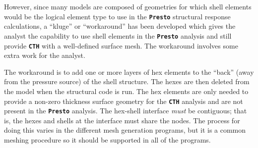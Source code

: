 \documentclass[11pt,twoside]{article}
\newcommand{\code}[1]
   {\mbox{\bf\tt #1}\null}
\begin{document}
However, since many models are composed of geometries for which shell
elements would be the logical element type to use in the \code{Presto}
structural response calculations, a ``kluge'' or ``workaround'' has
been developed which gives the analyst the capability to use shell
elements in the \code{Presto} analysis and still provide \code{CTH}
with a well-defined surface mesh. The workaround involves some extra
work for the analyst.

The workaround is to add one or more layers of hex elements to the
``back'' (away from the pressure source) of the shell structure. The
hexes are then deleted from the model when the structural code is
run. The hex elements are only needed to provide a non-zero thickness
surface geometry for the \code{CTH} analysis and are not present in
the \code{Presto} analysis.  The hex-shell interface {\em must} be
contiguous; that is, the hexes and shells at the interface must share
the nodes. The process for doing this varies in the different mesh
generation programs, but it is a common meshing procedure so it should
be supported in all of the programs.
\end{document}
